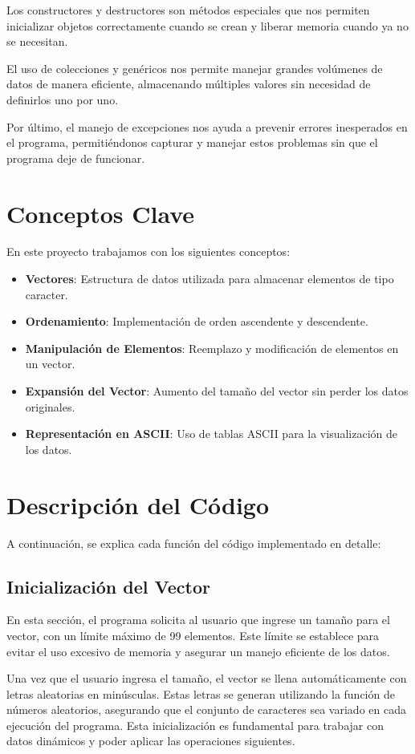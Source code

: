 \documentclass{article}
\begin{document}
Los constructores y destructores son métodos especiales que nos permiten inicializar objetos correctamente cuando se crean y liberar memoria cuando ya no se necesitan.

El uso de colecciones y genéricos nos permite manejar grandes volúmenes de datos de manera eficiente, almacenando múltiples valores sin necesidad de definirlos uno por uno.

Por último, el manejo de excepciones nos ayuda a prevenir errores inesperados en el programa, permitiéndonos capturar y manejar estos problemas sin que el programa deje de funcionar.



\section{Conceptos Clave}
En este proyecto trabajamos con los siguientes conceptos:
\begin{itemize}
    \item \textbf{Vectores}: Estructura de datos utilizada para almacenar elementos de tipo caracter.
    \item \textbf{Ordenamiento}: Implementación de orden ascendente y descendente.
    \item \textbf{Manipulación de Elementos}: Reemplazo y modificación de elementos en un vector.
    \item \textbf{Expansión del Vector}: Aumento del tamaño del vector sin perder los datos originales.
    \item \textbf{Representación en ASCII}: Uso de tablas ASCII para la visualización de los datos.
\end{itemize}

\section{Descripci\'on del C\'odigo}
A continuación, se explica cada función del código implementado en detalle:

\subsection{Inicialización del Vector}
En esta sección, el programa solicita al usuario que ingrese un tamaño para el vector, con un límite máximo de 99 elementos. Este límite se establece para evitar el uso excesivo de memoria y asegurar un manejo eficiente de los datos.

Una vez que el usuario ingresa el tamaño, el vector se llena automáticamente con letras aleatorias en minúsculas. Estas letras se generan utilizando la función de números aleatorios, asegurando que el conjunto de caracteres sea variado en cada ejecución del programa. Esta inicialización es fundamental para trabajar con datos dinámicos y poder aplicar las operaciones siguientes.
\end{document}
